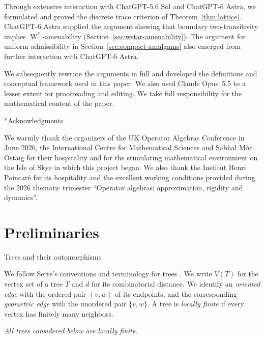 \documentclass[11pt]{amsart}
\makeatletter
\numberwithin{equation}{section}
\def\subsection{\@startsection{subsection}{2}%
  \z@{.7\linespacing\@plus.7\linespacing}{.3\linespacing}%
  {\normalfont\bfseries}}
\newcommand{\Wstar}{\operatorname{W}^*}
\theoremstyle{definition}
\makeatother
\begin{document}
Through extensive interaction with ChatGPT-5.6 Sol and ChatGPT-6 Astra, we formulated and proved the discrete trace criterion of Theorem~\ref{thm:lattice}. ChatGPT-6 Astra supplied the argument showing that boundary two-transitivity implies $\Wstar$-amenability (Section~\ref{sec:wstar-amenability}). The argument for uniform admissibility in Section~\ref{sec:compact-amalgams} also emerged from further interaction with ChatGPT-6 Astra.

We subsequently rewrote the arguments in full and developed the definitions and conceptual framework used in this paper. We also used Claude Opus~5.5 to a lesser extent for proofreading and editing. We take full responsibility for the mathematical content of the paper.

\subsection*{Acknowledgments}

We warmly thank the organizers of the UK Operator Algebras Conference in June 2026, the International Centre for Mathematical Sciences and Sabhal M\`or Ostaig for their hospitality and for the stimulating mathematical environment on the Isle of Skye in which this project began. We also thank the Institut Henri Poincar\'e for its hospitality and the excellent working conditions provided during the 2026 thematic trimester ``Operator algebras: approximation, rigidity and dynamics''.

\tableofcontents

\section{Preliminaries}
\label{sec:preliminaries}

\subsection{Trees and their automorphisms}
\label{subsec:prelim-trees}

We follow Serre's conventions and terminology for trees \cite{Serre80}. We write $V(T)$ for the vertex set of a tree $T$ and $d$ for its combinatorial distance. We identify an \emph{oriented edge} with the ordered pair $(v,w)$ of its endpoints, and the corresponding \emph{geometric edge} with the unordered pair $\{v,w\}$. A tree is \emph{locally finite} if every vertex has finitely many neighbors.
\begin{center}
    \vspace{\medskipamount}
    \emph{All trees considered below are locally finite.}
    \vspace{\medskipamount}
\end{center}
\end{document}
